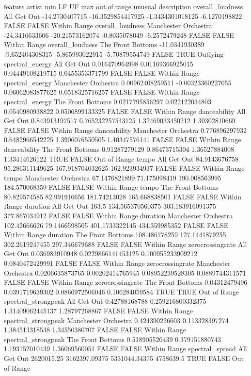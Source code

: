 feature artist min LF UF max out.of.range unusual description
overall_loudness All Get Out -14.2730407715 -16.3529854417925 -1.3434301018125 -6.1270198822 FALSE FALSE Within Range
overall_loudness Manchester Orchestra -24.3416633606 -20.21573162074 -0.8035078049 -6.2572479248 FALSE FALSE Within Range
overall_loudness The Front Bottoms -11.0341930389 -9.652404308315 -5.865993022915 -5.70879554749 FALSE TRUE Outlying
spectral_energy All Get Out 0.016470964998 0.01169366925015 0.04449108219715 0.0455353371799 FALSE FALSE Within Range
spectral_energy Manchester Orchestra 0.00962408259511 -0.00323360227055 0.06062083877625 0.0518325716257 FALSE FALSE Within Range
spectral_energy The Front Bottoms 0.0217795856297 0.022122034803 0.0540980938822 0.0506899133325 FALSE FALSE Within Range
danceability All Get Out 0.843913197517 0.765232257543125 1.32469033450212 1.30302810669 FALSE FALSE Within Range
danceability Manchester Orchestra 0.776896297932 0.6482966542225 1.3906076550505 1.40347576141 FALSE FALSE Within Range
danceability The Front Bottoms 0.91287279129 0.86473715304 1.36527884008 1.33414626122 TRUE FALSE Out of Range
tempo All Get Out 84.9143676758 95.286311149625 167.918704032625 162.923934937 FALSE FALSE Within Range
tempo Manchester Orchestra 67.1476821899 71.175098419 190.008563995 184.570068359 FALSE FALSE Within Range
tempo The Front Bottoms 80.829574585 82.991916656 181.74213028 165.668838501 FALSE FALSE Within Range
duration All Get Out 163.5 134.565370560375 303.183916091375 377.867034912 FALSE FALSE Within Range
duration Manchester Orchestra 102.42666626 79.1466598505 401.1733322145 434.359985352 FALSE FALSE Within Range
duration The Front Bottoms 108.486778259 127.1441879255 302.2619247455 297.346679688 FALSE FALSE Within Range
zerocrossingrate All Get Out 0.036983910948 0.0229866141453125 0.100955233909212 0.0840472429991 FALSE FALSE Within Range
zerocrossingrate Manchester Orchestra 0.0206635873765 0.00202414765945 0.08952239528305 0.0889744311571 FALSE FALSE Within Range
zerocrossingrate The Front Bottoms 0.04312479496 0.0391719639302 0.0866972506046 0.106284059584 TRUE TRUE Out of Range
spectral_strongpeak All Get Out 0.42788168788 0.259216800332375 1.31409062445137 1.28797268867 FALSE FALSE Within Range
spectral_strongpeak Manchester Orchestra 0.424390226603 0.113328397274 1.384513318538 1.34550380707 FALSE FALSE Within Range
spectral_strongpeak The Front Bottoms 0.518905520439 0.379151880743 1.193152010439 1.36069560051 FALSE FALSE Within Range
spectral_spread All Get Out 2620015.25 3162397.09375 5331044.34375 4758639.5 TRUE FALSE Out of Range
